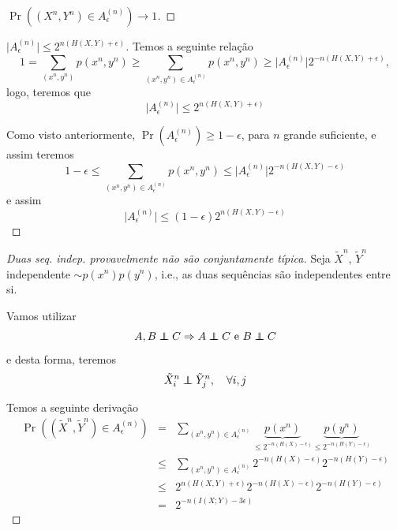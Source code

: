 \begin{frame}[allowframebreaks]
\begin{proof}[$\Pr \left( (X^n,Y^n) \in A_{\epsilon}^{(n)} \right) \rightarrow 1$]
  \end{proof}

  \framebreak

  \begin{proof}[$\vert A_{\epsilon}^{(n)} \vert \leq 2^{n(H(X,Y)+\epsilon)}$]
  Temos a seguinte relação
  \begin{equation}
  1 = \sum_{(x^n , y^n)} p(x^n, y^n) \geq \sum_{(x^n , y^n) \in A_{\epsilon}^{(n)}} p(x^n, y^n) \geq \vert A_{\epsilon}^{(n)} \vert 2^{-n(H(X,Y)+\epsilon)}  ,
  \end{equation} 
  logo, teremos que
  \begin{equation}
  \vert A_{\epsilon}^{(n)} \vert \leq 2^{n(H(X,Y)+\epsilon)}
  \end{equation}

  \proofbreak

  Como visto anteriormente, $\Pr(A_{\epsilon}^{(n)}) \geq 1 - \epsilon$, para $n$ grande suficiente, e assim teremos
  \begin{equation}
  1 - \epsilon \leq \sum_{(x^n , y^n) \in A_{\epsilon}^{(n)}} p(x^n, y^n) \leq \vert A_{\epsilon}^{(n)} \vert 2^{-n(H(X,Y)-\epsilon)} 
  \end{equation}
  e assim
  \begin{equation}
  \vert A_{\epsilon}^{(n)} \vert \leq (1 - \epsilon) 2^{n(H(X,Y)-\epsilon)}
  \end{equation}

  \end{proof}


  \framebreak

  \begin{proof}[Duas seq. indep. provavelmente não são conjuntamente típica]
  Seja $\tilde{X}^n$, $\tilde{Y}^n$ independente $\sim p(x^n)p(y^n)$, i.e., as duas sequências 
  são independentes entre si.

  Vamos utilizar
  \begin{equation}
  A, B \independent C  \Rightarrow A \independent C \text{ e } B \independent C
  \end{equation}
  e desta forma, teremos
  \begin{equation}
  \tilde{X}_i^n \independent \tilde{Y}_j^n , \quad \forall i,j
  \end{equation}

  \proofbreak

  Temos a seguinte derivação
  \begin{eqnarray}
  \Pr \left( (\tilde{X}^n, \tilde{Y}^n) \in A_{\epsilon}^{(n)} \right) &=& \sum_{(x^n,y^n) \in A_{\epsilon}^{(n)}} \underbrace{p(x^n)}_{\leq 2^{-n(H(X)-\epsilon)}} \underbrace{p(y^n)}_{\leq 2^{-n(H(Y)-\epsilon)}} \nonumber \\
		&\leq& \sum_{(x^n,y^n) \in A_{\epsilon}^{(n)}} 2^{-n(H(X)-\epsilon)} 2^{-n(H(Y)-\epsilon)} \nonumber \\
		&\leq& 2^{n(H(X,Y)+\epsilon)} 2^{-n(H(X)-\epsilon)} 2^{-n(H(Y)-\epsilon)} \nonumber \\
		&=& 2^{-n(I(X;Y)-3\epsilon)}
  \end{eqnarray}


\end{proof}
\end{frame}
